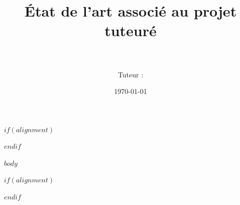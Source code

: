 \documentclass[a4paper,11pt]{article}
\title{État de l’art associé au projet tuteuré \\ \vspace{0.5cm} \LARGE{\textbf{\projecttitle}} \vspace{0.75cm}}
\author{\students \\ \vspace{1cm} \\ Tuteur : \tutor}
\date{\today}\newcolumntype{L}[1]{>{\raggedright\arraybackslash\hspace{0pt}}p{#1}}
\begin{document}
$if(alignment)$
\begin{$alignment$}
$endif$

$body$

$if(alignment)$
\end{$alignment$}
$endif$
\end{document}
